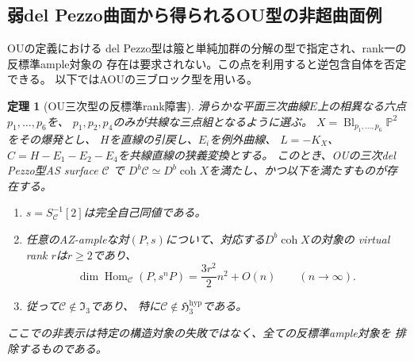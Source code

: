 \documentclass[11pt,a4paper]{ltjsarticle}
\newtheorem{theorem}{定理}[section]
\theoremstyle{definition}
\newcommand{\coh}{\operatorname{coh}}
\begin{document}
\subsection{弱del Pezzo曲面から得られるOU型の非超曲面例}
\label{subsec:ou-weak-del-pezzo}
OUの定義\cite[Definition~1.1(2), Definition~5.2]{OU}における
del Pezzo型は箙と単純加群の分解の型で指定され、rank一の反標準ample対象の
存在は要求されない。この点を利用すると逆包含自体を否定できる。
以下ではAOUの三ブロック型\cite[Sections~4, 7]{AOU2024}を用いる。

\begin{theorem}[OU三次型の反標準rank障害]\label{thm:ou-weak-cubic}
滑らかな平面三次曲線$E$上の相異なる六点$p_1,\ldots,p_6$を、
$p_1,p_2,p_4$のみが共線な三点組となるように選ぶ。
$X=\operatorname{Bl}_{p_1,\ldots,p_6}\mathbb P^2$をその爆発とし、
$H$を直線の引戻し、$E_i$を例外曲線、
$L=-K_X$、$C=H-E_1-E_2-E_4$を共線直線の狭義変換とする。
このとき、OUの三次del Pezzo型AS surface $\mathcal C$ で
$D^b\mathcal C\simeq D^b\coh X$を満たし、かつ以下を満たすものが存在する。
\begin{enumerate}[label=(\roman*)]
\item $s=S_{\mathcal C}^{-1}[2]$は完全自己同値である。
\item 任意のAZ-ampleな対$(P,s)$について、対応する$D^b\coh X$の対象の
virtual rank $r$は$r\geq 2$であり、
\[
 \dim\operatorname{Hom}_{\mathcal C}(P,s^nP)
      =\frac{3r^2}{2}n^2+O(n)\qquad(n\longrightarrow\infty).
\]
\item 従って$\mathcal C\notin\mathfrak I_3$であり、
特に$\mathcal C\notin\mathfrak H^{\mathrm{hyp}}_3$である。
\end{enumerate}
ここでの非表示は特定の構造対象の失敗ではなく、全ての反標準ample対象を
排除するものである。
\end{theorem}
\end{document}
